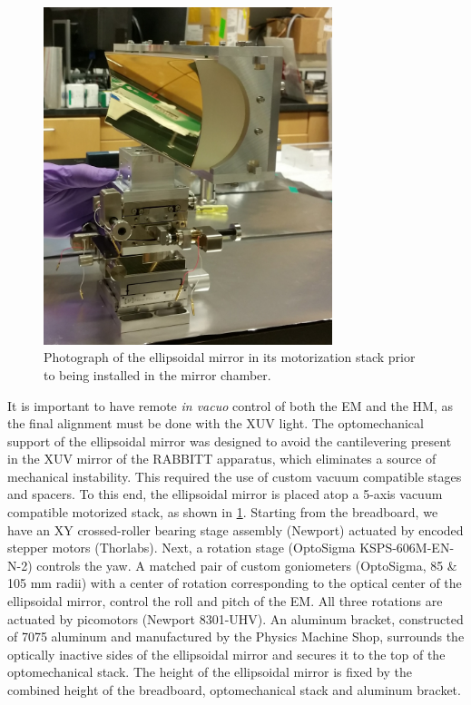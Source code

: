 \begin{figure}
	\centering
	\includegraphics[width=0.75\textwidth]{figures/chap2/EM_in_mount.jpg}
	\caption{Photograph of the ellipsoidal mirror in its motorization stack prior to being installed in the mirror chamber.}
	\label{fig:EM_in_mount}
\end{figure}

It is important to have remote \textit{in vacuo} control of both the EM and the HM, as the final alignment must be done with the XUV light. The optomechanical support of the ellipsoidal mirror was designed to avoid the cantilevering present in the XUV mirror of the RABBITT apparatus, which eliminates a source of mechanical instability. This required the use of custom vacuum compatible stages and spacers. To this end, the ellipsoidal mirror is placed atop a 5-axis vacuum compatible motorized stack, as shown in \cref{fig:EM_in_mount}. Starting from the breadboard, we have an XY crossed-roller bearing stage assembly (Newport) actuated by encoded stepper motors (Thorlabs). Next, a rotation stage (OptoSigma KSPS-606M-EN-N-2) controls the yaw. A matched pair of custom goniometers (OptoSigma, 85 \& 105 mm radii) with a center of rotation corresponding to the optical center of the ellipsoidal mirror, control the roll and pitch of the EM. All three rotations are actuated by picomotors (Newport 8301-UHV). An aluminum bracket, constructed of 7075 aluminum and manufactured by the Physics Machine Shop, surrounds the optically inactive sides of the ellipsoidal mirror and secures it to the top of the optomechanical stack. The height of the ellipsoidal mirror is fixed by the combined height of the breadboard, optomechanical stack and aluminum bracket.

